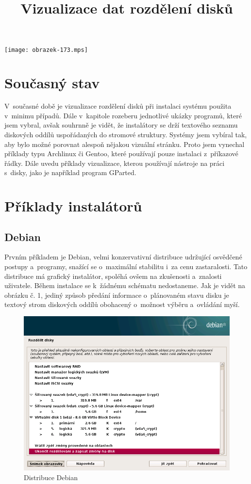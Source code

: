 \documentclass[a4paper,twosided]{article}
\begin{document}
\title{Vizualizace dat rozdělení disků}
\date{}
\maketitle
\texttt{[image: obrazek-173.mps]}
\section{Současný stav}

V~současné době je vizualizace rozdělení disků při instalaci systému použita v~minimu případů. Dále v~kapitole rozeberu jednotlivé ukázky programů, které jsem vybral, avšak souhrnně je vidět, 
že instalátory se drží textového seznamu diskových oddílů uspořádaných do stromové struktury. Systémy jsem vybíral tak, aby bylo možné porovnat alespoň nějakou vizuální stránku. Proto jsem vynechal
příklady typu Archlinux či Gentoo, které používají pouze instalaci z~příkazové řádky.  Dále uvedu příklady vizualizace, kterou používají nástroje na práci s~disky, jako je 
například program GParted.

\section{Příklady instalátorů}

\subsection{Debian}

Prvním příkladem je Debian, velmi konzervativní distribuce udržující osvědčené postupy a~programy, snažící se o~maximální stabilitu i~za cenu zastaralosti. 
Tato distribuce má grafický instalátor, spoléhá ovšem na zkušenosti a~znalosti uživatele. Během instalace se k~žádnému schématu nedostaneme. Jak je vidět na obrázku č. 1, jediný způsob předání 
informace o~plánovaném stavu disku je textový strom diskových oddílů obohacený o~možnost výběru a~ovládání myší.

\begin{figure}[b]
\caption{Distribuce Debian}
\centering
\includegraphics[width=.8\columnwidth]{pics/debian1.png}
\end{figure}
\end{document}
